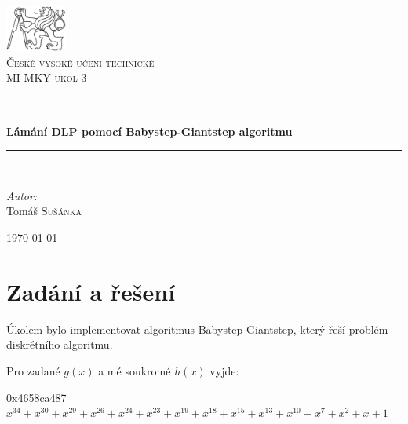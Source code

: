 \documentclass[czech,a4paper,11pt]{article}
\newcommand{\HRule}{\rule{\linewidth}{0.5mm}}
\begin{document}
\begin{titlepage}
\begin{center}

\includegraphics[width=0.15\textwidth]{./cvut-logo-bw.pdf}~\\[1cm]

\textsc{\LARGE České vysoké učení technické }\\[1.5cm]

\textsc{\Large MI-MKY úkol 3}\\[0.5cm]

\HRule \\[0.4cm]
{ \huge \bfseries Lámání DLP pomocí Babystep-Giantstep algoritmu \\[0.4cm] }

\HRule \\[1.5cm]

\begin{minipage}{0.4\textwidth}
\begin{flushleft} \large
\emph{Autor:}\\
Tomáš \textsc{Sušánka}
\end{flushleft}
\end{minipage}

\vfill

{\large \today}

\end{center}
\end{titlepage}


\newpage
\tableofcontents

\newpage
\section{Zadání a řešení}
Úkolem bylo implementovat algoritmus Babystep-Giantstep, který řeší problém diskrétního algoritmu.

Pro zadané $g(x)$ a mé soukromé $h(x)$ vyjde:

\begin{table}[h!]
  \begin{center}
	0x4658ca487
	$x^{34}+x^{30}+x^{29}+x^{26}+x^{24}+x^{23}+x^{19}+x^{18}+x^{15}+x^{13}+x^{10}+x^7+x^2+x+1$
  \end{center}
\end{table}
\end{document}

